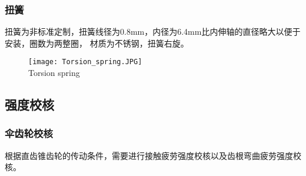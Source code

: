 \subsubsection{扭簧}

扭簧为非标准定制，扭簧线径为0.8mm，内径为6.4mm比内伸轴的直径略大以便于安装，圈数为两整圈，
材质为不锈钢，扭簧右旋。

\begin{figure}[!htp]
  \centering
  \texttt{[image: Torsion\_spring.JPG]} \\
    {Torsion spring}
  \label{fig:扭簧}
\end{figure}

\subsection{强度校核}

\subsubsection{伞齿轮校核}
根据直齿锥齿轮的传动条件，需要进行接触疲劳强度校核以及齿根弯曲疲劳强度校核。

